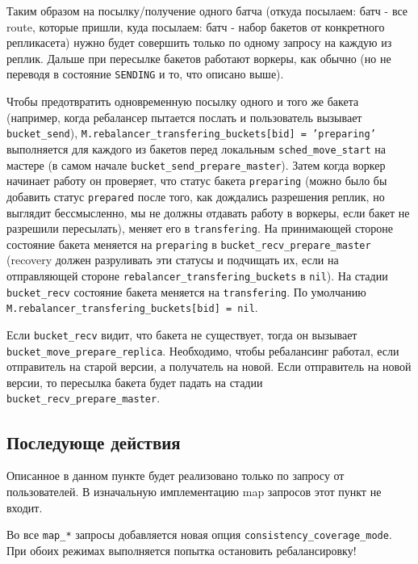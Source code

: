 Таким образом на посылку/получение одного батча (откуда посылаем: батч - все
route, которые пришли, куда посылаем: батч - набор бакетов от конкретного
репликасета) нужно будет совершить только по одному запросу на каждую из
реплик. Дальше при пересылке бакетов работают воркеры, как обычно (но не
переводя в состояние \texttt{SENDING} и то, что описано выше).

Чтобы предотвратить одновременную посылку одного и того же бакета (например,
когда ребалансер пытается послать и пользователь вызывает
\texttt{bucket\_send}), \texttt{M.rebalancer\_transfering\_buckets[bid] =
'preparing'} выполняется для каждого из бакетов перед локальным
\texttt{sched\_move\_start} на мастере (в самом начале
\texttt{bucket\_send\_prepare\_master}). Затем когда воркер начинает работу он
проверяет, что статус бакета \texttt{preparing} (можно было бы добавить статус
\texttt{prepared} после того, как дождались разрешения реплик, но выглядит
бессмысленно, мы не должны отдавать работу в воркеры, если бакет не разрешили
пересылать), меняет его в \texttt{transfering}. На принимающей стороне
состояние бакета меняется на \texttt{preparing} в
\texttt{bucket\_recv\_prepare\_master} (recovery должен разруливать эти статусы
и подчищать их, если на отправляющей стороне
\texttt{rebalancer\_transfering\_buckets} в \texttt{nil}). На стадии
\texttt{bucket\_recv} состояние бакета меняется на \texttt{transfering}. По
умолчанию \texttt{M.rebalancer\_transfering\_buckets[bid] = nil}.

Если \texttt{bucket\_recv} видит, что бакета не существует, тогда он вызывает
\texttt{bucket\_move\_prepare\_replica}. Необходимо, чтобы ребалансинг работал,
если отправитель на старой версии, а получатель на новой. Если отправитель на
новой версии, то пересылка бакета будет падать на стадии
\texttt{bucket\_recv\_prepare\_master}.

\subsection{Последующе действия}

Описанное в данном пункте будет реализовано только по запросу от пользователей.
В изначальную имплементацию map запросов этот пункт не входит.

Во все \texttt{map\_*} запросы добавляется новая опция
\texttt{consistency\_coverage\_mode}. При обоих режимах выполняется попытка
остановить ребалансировку!

